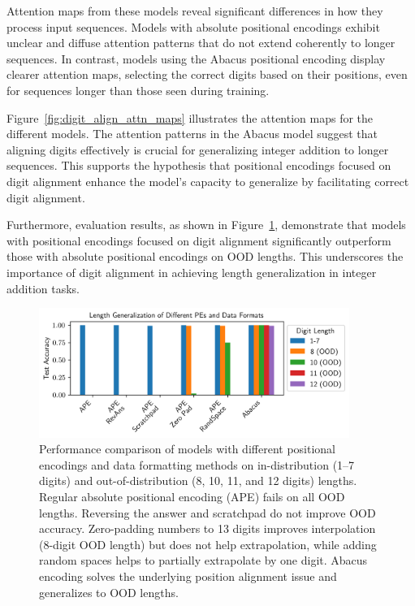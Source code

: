 Attention maps from these models reveal significant differences in how they process input sequences. Models with absolute positional encodings exhibit unclear and diffuse attention patterns that do not extend coherently to longer sequences. In contrast, models using the Abacus positional encoding display clearer attention maps, selecting the correct digits based on their positions, even for sequences longer than those seen during training.

Figure~\ref{fig:digit_align_attn_maps} illustrates the attention maps for the different models. The attention patterns in the Abacus model suggest that aligning digits effectively is crucial for generalizing integer addition to longer sequences. This supports the hypothesis that positional encodings focused on digit alignment enhance the model's capacity to generalize by facilitating correct digit alignment.

Furthermore, evaluation results, as shown in Figure~\ref{fig:pe_results}, demonstrate that models with positional encodings focused on digit alignment significantly outperform those with absolute positional encodings on OOD lengths. This underscores the importance of digit alignment in achieving length generalization in integer addition tasks.

\begin{figure}[!h]
    \centering
    \includegraphics[width=0.9\textwidth]{fig/pe_results.png}
    \caption{Performance comparison of models with different positional encodings and data formatting methods on in-distribution (1--7 digits) and out-of-distribution (8, 10, 11, and 12 digits) lengths. Regular absolute positional encoding (APE) fails on all OOD lengths. Reversing the answer and scratchpad do not improve OOD accuracy. Zero-padding numbers to 13 digits improves interpolation (8-digit OOD length) but does not help extrapolation, while adding random spaces helps to partially extrapolate by one digit. Abacus encoding solves the underlying position alignment issue and generalizes to OOD lengths.}
    \label{fig:pe_results}
\end{figure}

